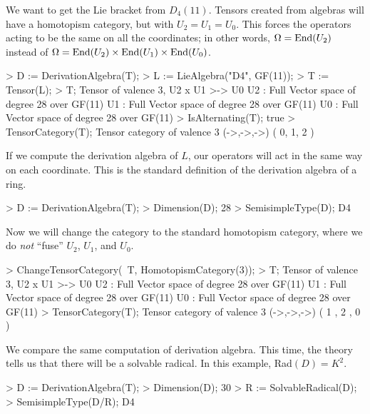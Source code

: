 \begin{example}[D4LieAlgebra]

We want to get the Lie bracket from $D_4(11)$. 
Tensors created from algebras will have a homotopism category, but with $U_2=U_1=U_0$. 
This forces the operators acting to be the same on all the coordinates; in other words, $\Omega=\operatorname{End}(U_2)$ instead of $\Omega=\operatorname{End}(U_2)\times\operatorname{End}(U_1)\times\operatorname{End}(U_0)$. 
\begin{code}
> D := DerivationAlgebra(T);
> L := LieAlgebra("D4", GF(11));
> T := Tensor(L);
> T;
Tensor of valence 3, U2 x U1 >-> U0
U2 : Full Vector space of degree 28 over GF(11)
U1 : Full Vector space of degree 28 over GF(11)
U0 : Full Vector space of degree 28 over GF(11)
> IsAlternating(T);
true
> TensorCategory(T);
Tensor category of valence 3 (->,->,->) ({ 0, 1, 2 })
\end{code}

If we compute the derivation algebra of $L$, our operators will act in the same way on each coordinate.
This is the standard definition of the derivation algebra of a ring.
\begin{code}
> D := DerivationAlgebra(T);
> Dimension(D);
28
> SemisimpleType(D);
D4
\end{code}

Now we will change the category to the standard homotopism category, where we do \emph{not} ``fuse'' $U_2$, $U_1$, and $U_0$. 
\begin{code}
> ChangeTensorCategory(~T, HomotopismCategory(3));
> T;
Tensor of valence 3, U2 x U1 >-> U0
U2 : Full Vector space of degree 28 over GF(11)
U1 : Full Vector space of degree 28 over GF(11)
U0 : Full Vector space of degree 28 over GF(11)
> TensorCategory(T);
Tensor category of valence 3 (->,->,->) ({ 1 },{ 2 },{ 0 })
\end{code}

We compare the same computation of derivation algebra. 
This time, the theory tells us that there will be a solvable radical.
In this example, Rad$(D)=K^2$. 
\begin{code}
> D := DerivationAlgebra(T);
> Dimension(D);
30
> R := SolvableRadical(D);
> SemisimpleType(D/R);
D4
\end{code}
\end{example}


